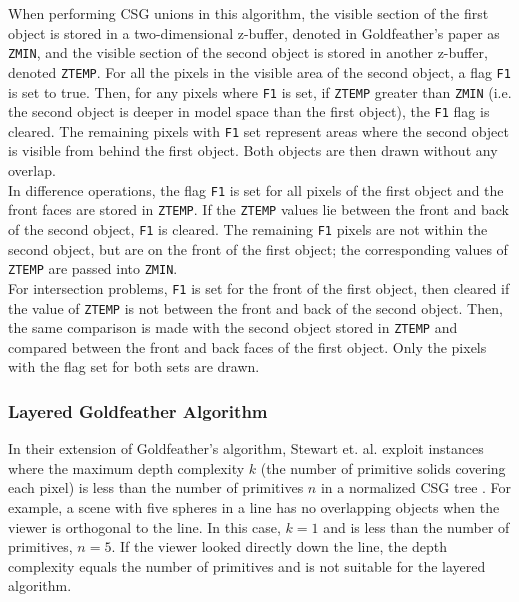 \documentclass[12pt]{article}
\begin{document}
\begin{doublespace}
When performing CSG unions in this algorithm, the visible section of the first object is stored in a two-dimensional z-buffer, denoted in Goldfeather's paper as \texttt{ZMIN}, and the visible section of the second object is stored in another z-buffer, denoted \texttt{ZTEMP}. For all the pixels in the visible area of the second object, a flag \texttt{F1} is set to true. Then, for any pixels where \texttt{F1} is set, if \texttt{ZTEMP} greater than \texttt{ZMIN} (i.e. the second object is deeper in model space than the first object), the \texttt{F1} flag is cleared. The remaining pixels with \texttt{F1} set represent areas where the second object is visible from behind the first object. Both objects are then drawn without any overlap.\\

In difference operations, the flag \texttt{F1} is set for all pixels of the first object and the front faces are stored in \texttt{ZTEMP}. If the \texttt{ZTEMP} values lie between the front and back of the second object, \texttt{F1} is cleared. The remaining \texttt{F1} pixels are not within the second object, but are on the front of the first object; the corresponding values of \texttt{ZTEMP} are passed into \texttt{ZMIN}.\\

For intersection problems, \texttt{F1} is set for the front of the first object, then cleared if the value of \texttt{ZTEMP} is not between the front and back of the second object. Then, the same comparison is made with the second object stored in \texttt{ZTEMP} and compared between the front and back faces of the first object. Only the pixels with the flag set for both sets are drawn.
\subsubsection{Layered Goldfeather Algorithm}
In their extension of Goldfeather's algorithm, Stewart et. al. exploit instances where the maximum depth complexity $k$ (the number of primitive solids covering each pixel) is less than the number of primitives $n$ in a normalized CSG tree \cite{layered_gold}. For example, a scene with five spheres in a line has no overlapping objects when the viewer is orthogonal to the line. In this case, $k=1$ and is less than the number of primitives, $n=5$. If the viewer looked directly down the line, the depth complexity equals the number of primitives and is not suitable for the layered algorithm.\\


\end{doublespace}
\end{document}
